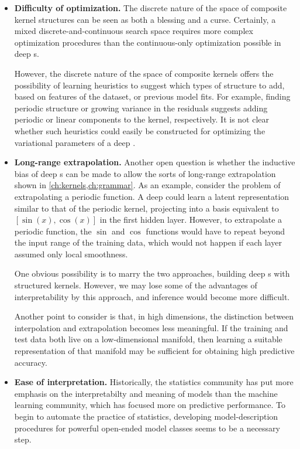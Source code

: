 \begin{itemize}

\item {\bf Difficulty of optimization.}
The discrete nature of the space of composite kernel structures can be seen as both a blessing and a curse.
Certainly, a mixed discrete-and-continuous search space requires more complex optimization procedures than the continuous-only optimization possible in deep \gp{}s.

However, the discrete nature of the space of composite kernels offers the possibility of learning heuristics to suggest which types of structure to add, based on features of the dataset, or previous model fits.
For example, finding periodic structure or growing variance in the residuals suggests adding periodic or linear components to the kernel, respectively.
It is not clear whether such heuristics could easily be constructed for optimizing the variational parameters of a deep \gp{}.

\item {\bf Long-range extrapolation.}
Another open question is whether the inductive bias of deep \gp{}s can be made to allow the sorts of long-range extrapolation shown in \cref{ch:kernels,ch:grammar}.
As an example, consider the problem of extrapolating a periodic function.
A deep \gp{} could learn a latent representation similar to that of the periodic kernel, projecting into a basis equivalent to $[\sin(x), \cos(x)]$ in the first hidden layer.
However, to extrapolate a periodic function, the $\sin$ and $\cos$ functions would have to repeat beyond the input range of the training data, which would not happen if each layer assumed only local smoothness.

One obvious possibility is to marry the two approaches, building deep \gp{}s with structured kernels.
However, we may lose some of the advantages of interpretability by this approach, and inference would become more difficult.

Another point to consider is that, in high dimensions, the distinction between interpolation and extrapolation becomes less meaningful.
If the training and test data both live on a low-dimensional manifold, then learning a suitable representation of that manifold may be sufficient for obtaining high predictive accuracy.

\item {\bf Ease of interpretation.}
Historically, the statistics community has put more emphasis on the interpretabilty and meaning of models than the machine learning community, which has focused more on predictive performance.
To begin to automate the practice of statistics, developing model-description procedures for powerful open-ended model classes seems to be a necessary step. %


\end{itemize}
